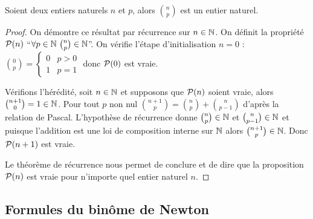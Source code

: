 \begin{prop}
  Soient deux entiers naturels $n$ et $p$, alors $\binom{n}{p}$ est un entier naturel.
\end{prop}
\begin{proof}
  On démontre ce résultat par récurrence sur $n\in\N$. On définit la propriété $\P(n)$ ``$\forall p \in \N \ \binom{n}{p}\in\N$''. On vérifie l'étape d'initialisation $n=0$ : $\binom{0}{p}=\begin{cases} 0 & p>0 \\ 1 & p=1\end{cases}$ donc $\P(0)$ est vraie. 
  
Vérifions l'hérédité, soit $n \in \N$ et supposons que $\P(n)$ soient vraie, alors $\binom{n+1}{0}=1\in \N$. Pour tout $p$ non nul $\binom{n+1}{p}=\binom{n}{p}+\binom{n}{p-1}$ d'après la relation de Pascal. L'hypothèse de récurrence donne $\binom{n}{p}\in\N$ et $\binom{n}{p-1}\in\N$ et puisque l'addition est une loi de composition interne sur $\N$ alors $\binom{n+1}{p}\in\N$. Donc $\P(n+1)$ est vraie. 

Le théorème de récurrence nous permet de conclure et de dire que la proposition $\P(n)$ est vraie pour n'importe quel entier naturel $n$.
\end{proof}

\subsection{Formules du binôme de Newton}

